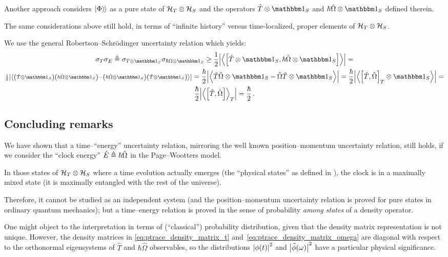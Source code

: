 Another approach considers $\left.\left| \Phi \right\rangle\hspace{-0.115em}\right\rangle$ as a pure state of $\mathcal{H}_T \otimes \mathcal{H}_S$
and the operators $\hat{T} \ox \idop_{S}$ and $\hbar\hat{\Omega} \ox \idop_{S}$
defined therein.

The same considerations above still hold, in terms of ``infinite history'' versus
time-localized, proper elements of $\mathcal{H}_T \otimes \mathcal{H}_S$. 

We use the general Robertson--Schr\"{o}dinger uncertainty relation which yields:
\begin{multline}
  \sigma_T \sigma_E \eqbydef
  \sigma_{T \ox \idop_S} \sigma_{\hbar\Omega \ox \idop_S} \geq
  \frac{1}{2} \abs{\expval{\comm
    {\hat{T}\ox\idop_S} {\hbar\hat{\Omega}\ox\idop_S}
  }} =
  \\
  {\scriptstyle
    \frac{1}{2} \abs{\expval{
      \qty(\hat{T}\ox\idop_S) \qty(\hbar\hat{\Omega}\ox\idop_S) -
      \qty(\hbar\hat{\Omega}\ox\idop_S) \qty(\hat{T}\ox\idop_S)
    }}
  } =
  \frac{\hbar}{2} \abs{\expval{
    \hat{T}\hat{\Omega}\ox\idop_S - \hat{\Omega}\hat{T}\ox\idop_S
  }} =
  \frac{\hbar}{2} \abs{\expval{
    \comm{\hat{T}}{\hat{\Omega}}_T \ox \idop_S
  }} =
  \\
  \frac{\hbar}{2} \abs{\expval{\comm
    {\hat{T}}{\hat{\Omega}}
  }_T} =
  \frac{\hbar}{2}
  \,\text{.}
\end{multline}

\subsection*{Concluding remarks}

We have shown that a time--``energy'' uncertainty relation,
mirroring the well known position--momentum uncertainty relation,
still holds, if we consider the ``clock energy'' $\hat{E} \triangleq \hbar\hat{\Omega}$
in the Page--Wootters model.

In those states of $\mathcal{H}_T \otimes \mathcal{H}_S$ where a time evolution actually emerges
(the ``physical states'' as defined in \cite{Lloyd:Time}),
the clock is in a maximally mixed state
(it is maximally entangled with the rest of the universe).

Therefore, it cannot be studied as an independent system
(and the position--momentum uncertainty relation is proved
for pure states in ordinary quantum mechanics); but a
time--energy relation is proved in the sense of probability
\emph{among states} of a density operator.

One might object to the interpretation in terms of (``classical'')
probability distribution, given
that the density matrix representation is
not unique.
However, the density matrices
in \eqref{eq:ptrace_density_matrix_t} and~\eqref{eq:ptrace_density_matrix_omega}
are diagonal with respect to
the orthonormal eigensystems of $\hat{T}$ and $\hbar \hat{\Omega}$ observables,
so the distributions $\abs{\phi(t)}^2$ and $\abs{\tilde{\phi}(\omega)}^2$
have a particular physical significance.

